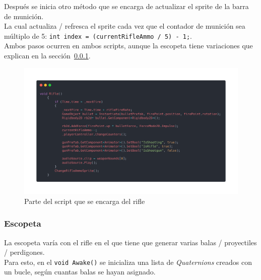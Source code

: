 \documentclass[12pt]{article}
\begin{document}
            Después se inicia otro método que se encarga de actualizar el sprite de la barra de munición.\\ 
            La cual actualiza / refresca el sprite cada vez que el contador de munición sea múltiplo de 5: \texttt{int index = (currentRifleAmmo / 5) - 1;}. \\

            Ambos pasos ocurren en ambos scripts, aunque la escopeta tiene variaciones que explican en la sección~\ref{escopeta}.

            \begin{figure}[H]
                \centering
                \includegraphics[width=\textwidth]{Images/ShootyMacShooty/rilfe.png}
                \caption{Parte del script que se encarga del rifle}
            \end{figure}
        \subsubsection{Escopeta} \label{escopeta}
            La escopeta varía con el rifle en el que tiene que generar varias balas / proyectiles / perdigones.\\

            Para esto, en el \texttt{void Awake()} se inicializa una lista de \textit{Quaternions} creados con un bucle, según cuantas balas se hayan asignado.\\ 
\end{document}
